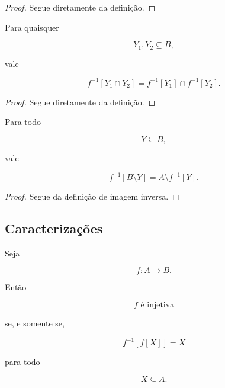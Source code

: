 \documentclass[../../main]{subfiles}
\begin{document}
\begin{proof}

	Segue diretamente da definição.

\end{proof}

\begin{prop}
	\label{prop:matematica:funcoes:imagem-direta-e-inversa:intersecao-inversa}

	Para quaisquer

	\[
		Y_1,Y_2\subseteq B,
	\]

	vale

	\[
		f^{-1}[Y_1\cap Y_2]
		=
		f^{-1}[Y_1]
		\cap
		f^{-1}[Y_2].
	\]

\end{prop}

\begin{proof}

	Segue diretamente da definição.

\end{proof}

\begin{prop}[Complemento]
	\label{prop:matematica:funcoes:imagem-direta-e-inversa:complemento}

	Para todo

	\[
		Y\subseteq B,
	\]

	vale

	\[
		f^{-1}[B\setminus Y]
		=
		A\setminus f^{-1}[Y].
	\]

\end{prop}

\begin{proof}

	Segue da definição de imagem inversa.

\end{proof}

\subsection{Caracterizações}

\begin{prop}
	\label{prop:matematica:funcoes:imagem-direta-e-inversa:caracterizacao-injetividade}

	Seja

	\[
		f:A\to B.
	\]

	Então

	\[
		f
		\text{ é injetiva}
	\]

	se, e somente se,

	\[
		f^{-1}[f[X]]
		=
		X
	\]

	para todo

	\[
		X\subseteq A.
	\]

\end{prop}
\end{document}
